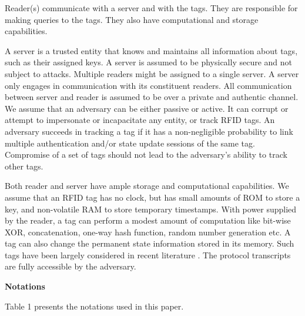 \documentclass{easychair}
\begin{document}
Reader(s) communicate with a server and with the tags.
They are responsible for making queries to the tags.
They also have computational and storage capabilities.

A server is a trusted entity that knows and maintains all
information about tags, such as their assigned keys. A server
is assumed to be physically secure and not subject to attacks.
Multiple readers might be assigned to a single server. A server
only engages in communication with its constituent readers.
All communication between server and reader is assumed to
be over a private and authentic channel. We assume that an
adversary can be either passive or active. It can corrupt or
attempt to impersonate or incapacitate any entity, or track
RFID tags. An adversary succeeds in tracking a tag if it
has a non-negligible probability to link multiple authentication
and/or state update sessions of the same tag. Compromise of
a set of tags should not lead to the adversary's ability to track
other tags. 

Both reader and server have ample storage and computational
capabilities. We assume that an RFID tag has no clock, but has small amounts of ROM to store a key, and non-volatile
RAM to store temporary timestamps. With power supplied by the
reader, a tag can perform a modest amount of computation like bit-wise XOR, concatenation, one-way hash function, 
random number generation etc. A tag can also change the permanent state information stored in its memory. Such tags 
have been largely considered in recent literature \cite{avoine,juels,molner,MolnerWagner,squash,Tsudik}. 
The protocol transcripts are fully accessible by
the adversary.

\textbf{Notations}

Table 1 presents the notations used in this paper.
\end{document}
